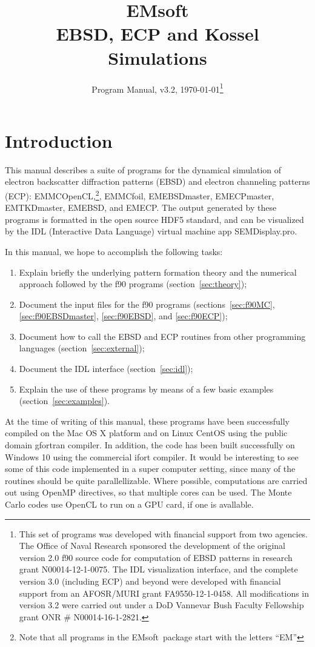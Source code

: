 \documentclass[DIV=calc, paper=letter, fontsize=11pt]{scrartcl}	 %
\title{EMsoft\\ EBSD, ECP and Kossel Simulations} %
\author{\vspace*{-0.7in}} %
\date{Program Manual, v3.2, \today\protect\footnote{This set of programs was developed with financial support from two agencies. 
The Office of Naval Research sponsored the development of the original version 2.0 f90 source code for computation of EBSD patterns in research 
grant N00014-12-1-0075.  The IDL visualization interface, and the complete version 3.0 (including ECP) and beyond were developed with financial 
support from an AFOSR/MURI grant FA9550-12-1-0458. All modifications in version 3.2 were carried out under a DoD Vannevar Bush Faculty Fellowship
grant ONR \# N00014-16-1-2821.}}
\newcommand{\ctp}{\textsf{EMsoft}}
\begin{document}
\maketitle

\vspace*{-0.5in}\begin{figure}[h]
\leavevmode\centering
\epsfxsize=4.0in
\end{figure}

\renewcommand{\contentsname}{Table of Contents}
{\vspace*{-0.1in}\footnotesize\tableofcontents}

\newpage
\section{Introduction}
This manual describes a suite of programs for the dynamical simulation of electron backscatter diffraction patterns (EBSD) and electron channeling patterns (ECP):
\textsf{EMMCOpenCL},\footnote{Note that all programs in the \ctp\ package start with the letters ``EM''}, \textsf{EMMCfoil}, \textsf{EMEBSDmaster}, \textsf{EMECPmaster}, \textsf{EMTKDmaster}, \textsf{EMEBSD},
and \textsf{EMECP}.  The output generated by these programs is formatted in the open source HDF5 standard, and
can be visualized by the IDL (Interactive Data Language) virtual machine app \textsf{SEMDisplay.pro}.  

In this manual, we hope to accomplish the following tasks:
\begin{enumerate}
	\item Explain briefly the underlying pattern formation theory and the numerical approach followed by the f90 programs (section~\ref{sec:theory});
	\item Document the input files for the f90 programs (sections~\ref{sec:f90MC}, \ref{sec:f90EBSDmaster}, \ref{sec:f90EBSD}, and \ref{sec:f90ECP});
	\item Document how to call the EBSD and ECP routines from other programming languages (section~\ref{sec:external});
	\item Document the IDL interface (section~\ref{sec:idl});
	\item Explain the use of these programs by means of a few basic examples (section~\ref{sec:examples}).
\end{enumerate}

At the time of writing of this manual, these programs have been successfully compiled on the Mac OS X platform and on Linux CentOS using the public domain gfortran compiler.  
In addition, the code has been built successfully on Windows 10 using the commercial ifort compiler.
It would be interesting to see some of this code implemented in a super computer setting, since many of the routines should be quite parallellizable.  Where possible, computations
are carried out using OpenMP directives, so that multiple cores can be used.  The Monte Carlo codes use OpenCL to run on a GPU card, if one is avallable.
\end{document}
